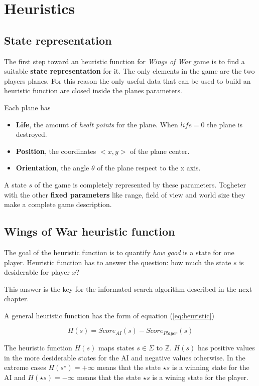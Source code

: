 
\chapter{Heuristics}

\section{State representation}

The first step toward an heuristic function for \emph{Wings of War} game is to find a 
suitable \textbf{state representation} for it. The only elements in the game are the two
players planes. For this reason the only useful data that can be used to build an heuristic
function are closed inside the planes parameters.

Each plane has

\begin{itemize}
  \item \textbf{Life}, the amount of \emph{healt points} for the plane. When $life=0$ the
    plane is destroyed.
  \item \textbf{Position}, the coordinates $<x,y>$ of the plane center.
  \item \textbf{Orientation}, the angle $\theta$ of the plane respect to the x axis.
\end{itemize}

A state $s$ of the game is completely represented by these parameters. Togheter with the
other \textbf{fixed parameters} like range, field of view and world size they make a
complete game description.

\section{Wings of War heuristic function}

The goal of the heuristic function is to quantify \emph{how good} is a state for one
player. Heuristic function has to answer the question: how much the state $s$ is
desiderable for player $x$?

This answer is the key for the informated search algorithm described in the next chapter.

A general heuristic function has the form of equation (\ref{eq:heuristic})

\begin{equation}
  H(s) = Score_{AI}(s) - Score_{Player}(s)
  \label{eq:heuristic}
\end{equation}

The heuristic function $H(s)$ maps states $s \in \Sigma$ to $\mathbb{Z}$. $H(s)$ has
positive values in the more desiderable states for the AI and negative values otherwise.
In the extreme cases $H(s^\star)=+\infty$ means that the state $\star{s}$ is a winning state
for the AI and $H(\star{s})=-\infty$ means that the state $\star{s}$ is a wining state for
the player.

